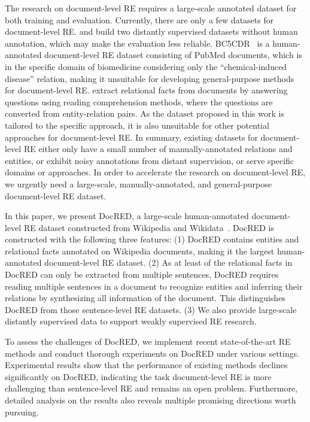 \documentclass[11pt,a4paper]{article}
\begin{document}
The research on document-level RE requires a large-scale annotated dataset for both training and evaluation. Currently, there are only a few datasets for document-level RE.  and  build two distantly supervised datasets without human annotation, which may make the evaluation less reliable. BC5CDR~\cite{li2016biocreative} is a human-annotated document-level RE dataset consisting of  PubMed documents, which is in the specific domain of biomedicine considering only the ``chemical-induced disease'' relation, making it unsuitable for developing general-purpose methods for document-level RE.  extract relational facts from documents by answering questions using reading comprehension methods, where the questions are converted from entity-relation pairs. As the dataset proposed in this work is tailored to the specific approach, it is also unsuitable for other potential approaches for document-level RE. In summary, existing datasets for document-level RE either only  have a small number of manually-annotated relations and entities, or exhibit noisy annotations from distant supervision, or serve specific domains or approaches. In order to accelerate the research on document-level RE, we urgently need a large-scale, manually-annotated, and general-purpose document-level RE dataset.

In this paper, we present DocRED, a large-scale human-annotated document-level RE dataset constructed from Wikipedia and Wikidata~\cite{DBLP:conf/semweb/ErxlebenGKMV14,vrandevcic2014wikidata}.
DocRED is constructed with the following three features: (1) DocRED contains  entities and  relational facts annotated on  Wikipedia documents, making it the largest human-annotated document-level RE dataset. (2) As at least  of the relational facts in DocRED can only be extracted from multiple sentences, DocRED requires reading multiple sentences in a document to recognize entities and inferring their relations by synthesizing all information of the document. This distinguishes DocRED from those sentence-level RE datasets. (3) We also provide large-scale distantly supervised data to support weakly supervised RE research.

To assess the challenges of DocRED, we implement recent state-of-the-art RE methods and conduct thorough experiments on DocRED under various settings. Experimental results show that the performance of existing methods declines significantly on DocRED, indicating the task document-level RE is more challenging than sentence-level RE and remains an open problem. Furthermore, detailed analysis on the results also reveals multiple promising directions worth pursuing. 
\end{document}
